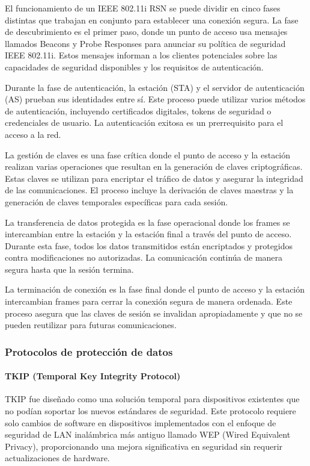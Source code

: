El funcionamiento de un IEEE 802.11i RSN se puede dividir en cinco fases distintas que trabajan en conjunto para establecer una conexión segura. La fase de descubrimiento es el primer paso, donde un punto de acceso usa mensajes llamados Beacons y Probe Responses para anunciar su política de seguridad IEEE 802.11i. Estos mensajes informan a los clientes potenciales sobre las capacidades de seguridad disponibles y los requisitos de autenticación.

Durante la fase de autenticación, la estación (STA) y el servidor de autenticación (AS) prueban sus identidades entre sí. Este proceso puede utilizar varios métodos de autenticación, incluyendo certificados digitales, tokens de seguridad o credenciales de usuario. La autenticación exitosa es un prerrequisito para el acceso a la red.

La gestión de claves es una fase crítica donde el punto de acceso y la estación realizan varias operaciones que resultan en la generación de claves criptográficas. Estas claves se utilizan para encriptar el tráfico de datos y asegurar la integridad de las comunicaciones. El proceso incluye la derivación de claves maestras y la generación de claves temporales específicas para cada sesión.

La transferencia de datos protegida es la fase operacional donde los frames se intercambian entre la estación y la estación final a través del punto de acceso. Durante esta fase, todos los datos transmitidos están encriptados y protegidos contra modificaciones no autorizadas. La comunicación continúa de manera segura hasta que la sesión termina.

La terminación de conexión es la fase final donde el punto de acceso y la estación intercambian frames para cerrar la conexión segura de manera ordenada. Este proceso asegura que las claves de sesión se invalidan apropiadamente y que no se pueden reutilizar para futuras comunicaciones.

\subsubsection{Protocolos de protección de datos}

\paragraph{TKIP (Temporal Key Integrity Protocol)}

TKIP fue diseñado como una solución temporal para dispositivos existentes que no podían soportar los nuevos estándares de seguridad. Este protocolo requiere solo cambios de software en dispositivos implementados con el enfoque de seguridad de LAN inalámbrica más antiguo llamado WEP (Wired Equivalent Privacy), proporcionando una mejora significativa en seguridad sin requerir actualizaciones de hardware.

